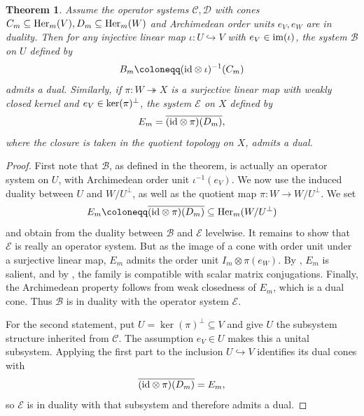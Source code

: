\documentclass[11pt,onecolumn]{article}
\theoremstyle{plain}
\newtheorem{theorem}{Theorem}[section]
\theoremstyle{definition}
\begin{document}
\begin{theorem}
\label{thm:real}
    Assume the operator systems $\mathcal C, \mathcal D$ with cones $C_m\subseteq{\rm Her}_m(V), D_m\subseteq{\rm Her}_m(W)$ and Archimedean order units $e_V,e_W$ are in duality. Then for any injective linear map $\iota\colon U\hookrightarrow V$ with $e_V\in{\rm im}(\iota)$, the system $\mathcal B$ on $U$ defined by
    \[
        B_m\coloneqq ({\rm id}\otimes \iota)^{-1}(C_m)
    \]    
    admits a dual. Similarly, if $\pi\colon W\twoheadrightarrow X$ is a surjective linear map with weakly closed kernel and $e_V\in{\rm ker}(\pi)^\perp$, the system $\mathcal E$ on $X$ defined by 
    \[
      E_m=\overline{({\rm id}\otimes\pi)(D_m)},  
    \] 
    where the closure is taken in the quotient topology on $X$, admits a dual.
\end{theorem}
\begin{proof}
    First note that $\mathcal B$, as defined in the theorem, is actually an operator system on $U$, with Archimedean order unit $\iota^{-1}(e_V)$. We now use the induced duality between $U$ and $W/U^\perp$, as well as
    the quotient map $\pi\colon W\to W/U^\perp$. We set 
    \[
        E_m\coloneqq\overline{({\rm id}\otimes\pi)(D_m)}\subseteq {\rm Her}_m(W/U^\perp)
    \]       
    and obtain from  the duality between $\mathcal B$ and $\mathcal E$ levelwise. It remains to show that $\mathcal E$ is really an operator system. But as the image of a cone with order unit under a surjective linear map, $E_m$ admits the order unit $I_m\otimes\pi(e_W)$. By , $E_m$ is salient, and by , the family is compatible with scalar matrix conjugations. Finally, the Archimedean property follows from weak closedness of $E_m$, which is a dual cone. Thus $\mathcal B$ is in duality with the operator system $\mathcal E$.

    For the second statement, put $U=\ker(\pi)^\perp\subseteq V$ and give
    $U$ the subsystem structure inherited from $\mathcal C$.  The assumption
    $e_V\in U$ makes this a unital subsystem. Applying the first part to the
    inclusion $U\hookrightarrow V$ identifies its dual cones with
    \[
        \overline{({\rm id}\otimes\pi)(D_m)}=E_m,
    \]
    so $\mathcal E$ is in duality with that subsystem and therefore admits a
    dual.
\end{proof}
\end{document}
